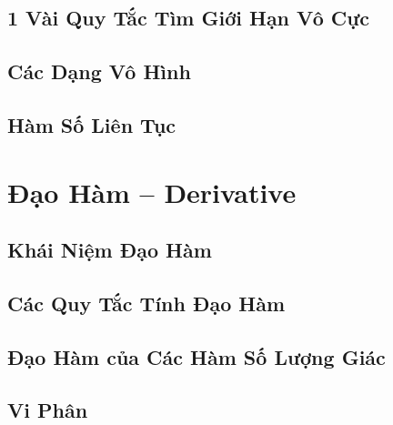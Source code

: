\documentclass[oneside]{book}
\numberwithin{equation}{section}
\begin{document}

\section{1 Vài Quy Tắc Tìm Giới Hạn Vô Cực}


\section{Các Dạng Vô Hình}


\section{Hàm Số Liên Tục}


\chapter{Đạo Hàm -- Derivative}

\section{Khái Niệm Đạo Hàm}


\section{Các Quy Tắc Tính Đạo Hàm}


\section{Đạo Hàm của Các Hàm Số Lượng Giác}


\section{Vi Phân}
\end{document}
